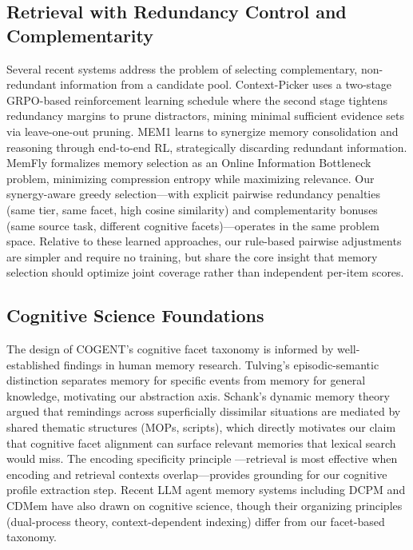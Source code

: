\documentclass[letterpaper]{article} %
\begin{document}
\subsection{Retrieval with Redundancy Control and Complementarity}

Several recent systems address the problem of selecting complementary, non-redundant information from a candidate pool. Context-Picker \cite{context-picker} uses a two-stage GRPO-based reinforcement learning schedule where the second stage tightens redundancy margins to prune distractors, mining minimal sufficient evidence sets via leave-one-out pruning. MEM1 \cite{mem1} learns to synergize memory consolidation and reasoning through end-to-end RL, strategically discarding redundant information. MemFly \cite{memfly} formalizes memory selection as an Online Information Bottleneck problem, minimizing compression entropy while maximizing relevance. Our synergy-aware greedy selection---with explicit pairwise redundancy penalties (same tier, same facet, high cosine similarity) and complementarity bonuses (same source task, different cognitive facets)---operates in the same problem space. Relative to these learned approaches, our rule-based pairwise adjustments are simpler and require no training, but share the core insight that memory selection should optimize joint coverage rather than independent per-item scores.

\subsection{Cognitive Science Foundations}

The design of \textsc{COGENT}'s cognitive facet taxonomy is informed by well-established findings in human memory research. Tulving's episodic-semantic distinction \cite{tulving-episodic} separates memory for specific events from memory for general knowledge, motivating our abstraction axis. Schank's dynamic memory theory \cite{schank-dynamic} argued that remindings across superficially dissimilar situations are mediated by shared thematic structures (MOPs, scripts), which directly motivates our claim that cognitive facet alignment can surface relevant memories that lexical search would miss. The encoding specificity principle \cite{tulving-encoding}---retrieval is most effective when encoding and retrieval contexts overlap---provides grounding for our cognitive profile extraction step. Recent LLM agent memory systems including DCPM \cite{dcpm} and CDMem \cite{cdmem} have also drawn on cognitive science, though their organizing principles (dual-process theory, context-dependent indexing) differ from our facet-based taxonomy.
\end{document}
